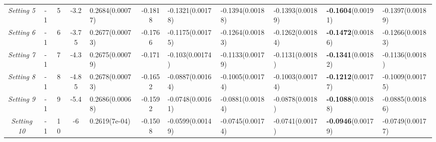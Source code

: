 \documentclass{article}
\begin{document}
\begin{table}[H]
\begin{tabular}{ccccp{15mm}||cp{15mm}p{15mm}p{15mm}p{15mm}p{15mm}}
			\textsl{Setting 5} & -1 & 5 & -3.2 & 0.2684\newline (0.00077) & -0.1818 & -0.1321\newline (0.00178) & -0.1394\newline (0.00188) & -0.1393\newline (0.00189) & \textbf{-0.1604}\newline (0.00191) & -0.1397\newline (0.00189) \\ 
			\textsl{Setting 6} & -1 & 6 & -3.75 & 0.2677\newline (0.00073) & -0.1766 & -0.1175\newline (0.00175) & -0.1264\newline (0.00183) & -0.1262\newline (0.00184) & \textbf{-0.1472}\newline (0.00186) & -0.1266\newline (0.00183) \\ 
			\textsl{Setting 7} & -1 & 7 & -4.3 & 0.2675\newline (0.00079) & -0.171 & -0.103\newline (0.00174) & -0.1133\newline (0.00179) & -0.1131\newline (0.0018) & \textbf{-0.1341}\newline (0.00182) & -0.1136\newline (0.0018) \\ 
			\textsl{Setting 8} & -1 & 8 & -4.85 & 0.2678\newline (0.00073) & -0.1652 & -0.0887\newline (0.00164) & -0.1005\newline (0.00174) & -0.1003\newline (0.00174) & \textbf{-0.1212}\newline (0.00177) & -0.1009\newline (0.00175) \\ 
			\textsl{Setting 9} & -1 & 9 & -5.4 & 0.2686\newline (0.00068) & -0.1592 & -0.0748\newline (0.00161) & -0.0881\newline (0.00184) & -0.0878\newline (0.0018) & \textbf{-0.1088}\newline (0.00188) & -0.0885\newline (0.00186) \\ 
			\textsl{Setting 10} & -1 & 10 & -6 & 0.2619\newline (7e-04) & -0.1508 & -0.0599\newline (0.00149) & -0.0745\newline (0.00174) & -0.0741\newline (0.0017) & \textbf{-0.0946}\newline (0.00179) & -0.0749\newline (0.00177) \\ \hline
			

\end{tabular}
\end{table}
\end{document}
